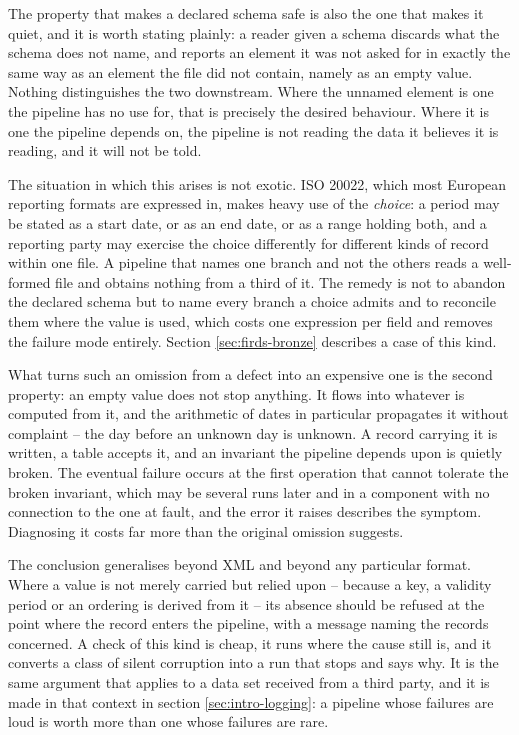 \documentclass[a4paper, 11pt]{report}
\begin{document}
The property that makes a declared schema safe is also the one that makes it quiet, and it is worth stating plainly: a reader given a schema discards what the schema does not name, and reports an element it was not asked for in exactly the same way as an element the file did not contain, namely as an empty value. Nothing distinguishes the two downstream. Where the unnamed element is one the pipeline has no use for, that is precisely the desired behaviour. Where it is one the pipeline depends on, the pipeline is not reading the data it believes it is reading, and it will not be told.

The situation in which this arises is not exotic. ISO 20022, which most European reporting formats are expressed in, makes heavy use of the \emph{choice}: a period may be stated as a start date, or as an end date, or as a range holding both, and a reporting party may exercise the choice differently for different kinds of record within one file. A pipeline that names one branch and not the others reads a well-formed file and obtains nothing from a third of it. The remedy is not to abandon the declared schema but to name every branch a choice admits and to reconcile them where the value is used, which costs one expression per field and removes the failure mode entirely. Section \ref{sec:firds-bronze} describes a case of this kind.

What turns such an omission from a defect into an expensive one is the second property: an empty value does not stop anything. It flows into whatever is computed from it, and the arithmetic of dates in particular propagates it without complaint -- the day before an unknown day is unknown. A record carrying it is written, a table accepts it, and an invariant the pipeline depends upon is quietly broken. The eventual failure occurs at the first operation that cannot tolerate the broken invariant, which may be several runs later and in a component with no connection to the one at fault, and the error it raises describes the symptom. Diagnosing it costs far more than the original omission suggests.

The conclusion generalises beyond XML and beyond any particular format. Where a value is not merely carried but relied upon -- because a key, a validity period or an ordering is derived from it -- its absence should be refused at the point where the record enters the pipeline, with a message naming the records concerned. A check of this kind is cheap, it runs where the cause still is, and it converts a class of silent corruption into a run that stops and says why. It is the same argument that applies to a data set received from a third party, and it is made in that context in section \ref{sec:intro-logging}: a pipeline whose failures are loud is worth more than one whose failures are rare.
\end{document}
